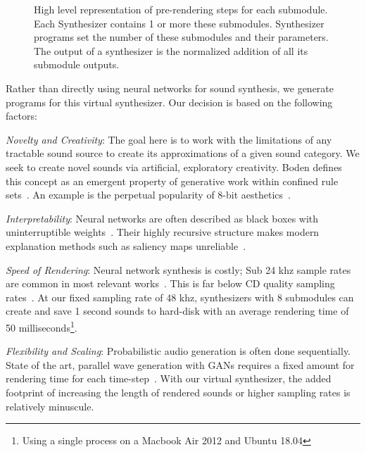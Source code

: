\documentclass[runningheads,a4paper]{llncs}
\begin{document}
 \begin{figure}[pb]
    \begin{center}
    \end{center}
    \caption{High level representation of pre-rendering steps for each submodule. Each Synthesizer contains 1 or more these submodules. Synthesizer programs set the number of these submodules and their parameters. The output of a synthesizer is the normalized addition of all its submodule outputs. 
    }
\label{fig:submodule}
\end{figure}

 Rather than directly using neural networks for sound synthesis, we generate programs for this virtual synthesizer. Our decision is based on the following factors:
\begin{enumerate*}[label=(\roman*)]
    \item \textit{Novelty and Creativity}: The goal here is to work with the limitations of any tractable sound source to create its approximations of a given sound category. We seek to create novel sounds via artificial, exploratory creativity. Boden defines this concept as an emergent property of generative work within confined rule sets~\cite{boden2009computer}. An example is the perpetual popularity of 8-bit aesthetics~\cite{collins2007loop}. 
    \item \textit{Interpretability}: Neural networks are often described as black boxes with uninterruptible weights~\cite{basheer2000artificial}. Their highly recursive structure makes modern explanation methods such as saliency maps unreliable~\cite{rudin2019stop}.  
    \item \textit{Speed of Rendering}: Neural network synthesis is costly; Sub 24 khz sample rates are common in most relevant works~\cite{yamamoto2020parallel,oord2017parallel,aouameur2019neural,ramires2020neural}. This is far below CD quality sampling rates~\cite{reiss2016meta}. At our fixed sampling rate of 48 khz, synthesizers with 8 submodules can create and save 1 second sounds to hard-disk with an average rendering time of 50 milliseconds\footnote{Using a single process on a Macbook Air 2012 and Ubuntu 18.04}. 
    \item \textit{Flexibility and Scaling}: Probabilistic audio generation is often done sequentially. State of the art, parallel wave generation with GANs requires a fixed amount for rendering time for each time-step~\cite{yamamoto2020parallel}. With our virtual synthesizer, the added footprint of increasing the length of rendered sounds or higher sampling rates is relatively minuscule.  
\end{enumerate*}
\end{document}
